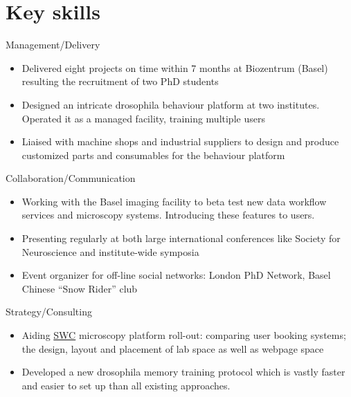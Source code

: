 \documentclass[a4paper]{twentysecondcv} %
\begin{document}
\makeprofile %

\section{Key skills}
\twentyitem
        [1.0] %
   		{}
		{}
        {Management/Delivery}
        {}
        {}
        {
        \begin{itemize}
            \item Delivered eight projects on time within 7 months at Biozentrum (Basel) resulting the recruitment of two PhD students
            \item Designed an intricate drosophila behaviour platform at two institutes. Operated it as a managed facility, training multiple users
            \item Liaised with machine shops and industrial suppliers to design and produce customized parts and consumables for the behaviour platform
           \end{itemize}}
        
\twentyitem
        [1.0] %
  		{}
		{}
        {Collaboration/Communication}
        {}
        {}
        {
        \begin{itemize}
            \item Working with the Basel imaging facility to beta test new data workflow services and microscopy systems. Introducing these features to users. 
            \item Presenting regularly at both large international conferences like Society for Neuroscience and institute-wide symposia
            \item Event organizer for off-line social networks: London PhD Network, Basel Chinese “Snow Rider” club
          
        \end{itemize}}
        
\twentyitem
        [1.0] %
  		{}
		{}
        {Strategy/Consulting}
        {}
        {}
        {
        \begin{itemize}
            \item Aiding \href{http://www.ucl.ac.uk/swc}{SWC} microscopy platform roll-out: comparing user booking systems; the design, layout and placement of lab space as well as webpage space
            \item Developed a new drosophila memory training protocol which is vastly faster and easier to set up than all existing approaches. 
        \end{itemize}}        
\end{document}
